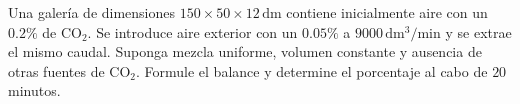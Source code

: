 Una galería de dimensiones $150\times50\times12\,\mathrm{dm}$ contiene inicialmente aire con un $0.2\%$ de $\mathrm{CO}_2$. Se introduce aire exterior con un $0.05\%$ a $9000\,\mathrm{dm^3/min}$ y se extrae el mismo caudal. Suponga mezcla uniforme, volumen constante y ausencia de otras fuentes de $\mathrm{CO}_2$. Formule el balance y determine el porcentaje al cabo de $20$ minutos.
